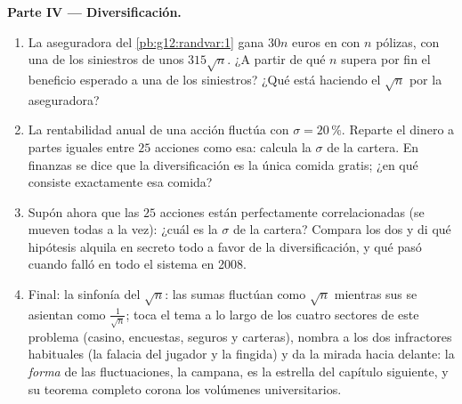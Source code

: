 \begin{problem}
\medskip
\noindent\textbf{Parte IV --- Diversificación.}
\begin{enumerate}[resume]
  \item La aseguradora del \cref{pb:g12:randvar:1} gana $30n$ euros en
         con $n$ pólizas, con una  de los
        siniestros de unos $315\sqrt n$. ¿A partir de qué $n$ supera por
        fin el beneficio esperado a una  de los
        siniestros? ¿Qué está haciendo el $\sqrt n$ por la aseguradora?
  \item La rentabilidad anual de una acción fluctúa con
        $\sigma = 20\,\%$. Reparte el dinero a partes iguales entre $25$
        acciones \emph{} como esa: calcula la $\sigma$ de la
        cartera. En finanzas se dice que la diversificación es la única
        comida gratis; ¿en qué consiste exactamente esa comida?
  \item Supón ahora que las $25$ acciones están perfectamente
        correlacionadas (se mueven todas a la vez): ¿cuál es la $\sigma$ de
        la cartera? Compara los dos  y di qué hipótesis alquila en
        secreto todo  a favor de la diversificación, y qué pasó
        cuando falló en todo el sistema en 2008.
  \item Final: la sinfonía del $\sqrt n$: las sumas fluctúan como
        $\sqrt n$ mientras sus  se asientan como
        $\frac{1}{\sqrt n}$; toca el tema a lo largo de los cuatro sectores
        de este problema (casino, encuestas, seguros y carteras), nombra a
        los dos infractores habituales (la falacia del jugador y la
         fingida) y da la mirada hacia delante: la
        \emph{forma} de las fluctuaciones, la campana, es la estrella
         del capítulo siguiente, y su teorema completo corona los
        volúmenes universitarios.
\end{enumerate}
\end{problem}
